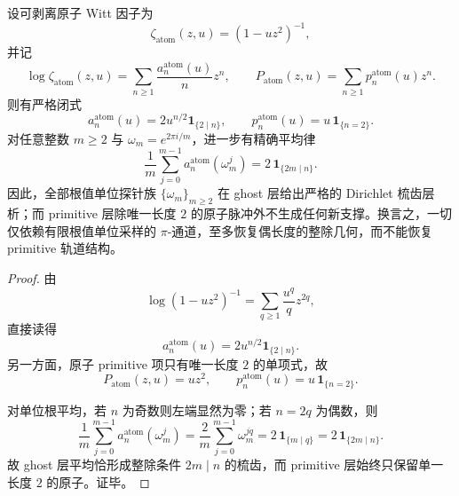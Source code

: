 \begin{theorem}\label{thm:conclusion-realinput40-root-unity-ghost-complete-primitive-degenerate}
设可剥离原子 Witt 因子为
\[
\zeta_{\mathrm{atom}}(z,u)=(1-uz^2)^{-1},
\]
并记
\[
\log \zeta_{\mathrm{atom}}(z,u)=\sum_{n\ge 1}\frac{a_n^{\mathrm{atom}}(u)}{n}z^n,
\qquad
P_{\mathrm{atom}}(z,u)=\sum_{n\ge 1}p_n^{\mathrm{atom}}(u)z^n.
\]
则有严格闭式
\[
a_n^{\mathrm{atom}}(u)=2u^{n/2}\mathbf 1_{\{2\mid n\}},
\qquad
p_n^{\mathrm{atom}}(u)=u\,\mathbf 1_{\{n=2\}}.
\]
对任意整数 \(m\ge 2\) 与 \(\omega_m=e^{2\pi i/m}\)，进一步有精确平均律
\[
\frac{1}{m}\sum_{j=0}^{m-1}a_n^{\mathrm{atom}}(\omega_m^j)
=
2\,\mathbf 1_{\{2m\mid n\}}.
\]
因此，全部根值单位探针族 \(\{\omega_m\}_{m\ge 2}\) 在 ghost 层给出严格的 Dirichlet 梳齿层析；而 primitive 层除唯一长度 \(2\) 的原子脉冲外不生成任何新支撑。换言之，一切仅依赖有限根值单位采样的 \(\pi\)-通道，至多恢复偶长度的整除几何，而不能恢复 primitive 轨道结构。
\end{theorem}
\begin{proof}
由
\[
\log(1-uz^2)^{-1}
=
\sum_{q\ge 1}\frac{u^q}{q}z^{2q},
\]
直接读得
\[
a_n^{\mathrm{atom}}(u)=2u^{n/2}\mathbf 1_{\{2\mid n\}}.
\]
另一方面，原子 primitive 项只有唯一长度 \(2\) 的单项式，故
\[
P_{\mathrm{atom}}(z,u)=uz^2,
\qquad
p_n^{\mathrm{atom}}(u)=u\,\mathbf 1_{\{n=2\}}.
\]

对单位根平均，若 \(n\) 为奇数则左端显然为零；若 \(n=2q\) 为偶数，则
\[
\frac{1}{m}\sum_{j=0}^{m-1}a_n^{\mathrm{atom}}(\omega_m^j)
=
\frac{2}{m}\sum_{j=0}^{m-1}\omega_m^{jq}
=
2\,\mathbf 1_{\{m\mid q\}}
=
2\,\mathbf 1_{\{2m\mid n\}}.
\]
故 ghost 层平均恰形成整除条件 \(2m\mid n\) 的梳齿，而 primitive 层始终只保留单一长度 \(2\) 的原子。证毕。
\end{proof}

